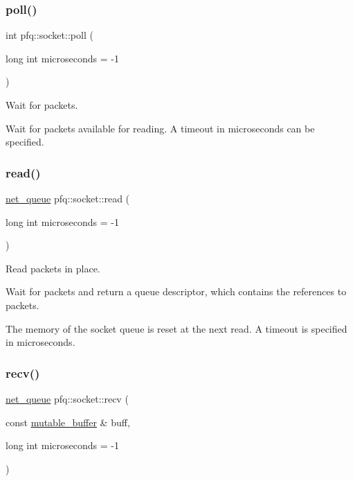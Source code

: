 \subsubsection{\texorpdfstring{poll()}{poll()}}
{\footnotesize\ttfamily int pfq\+::socket\+::poll (\begin{DoxyParamCaption}\item[{long int}]{microseconds = {\ttfamily -\/1} }\end{DoxyParamCaption})\hspace{0.3cm}{\ttfamily [inline]}}



Wait for packets. 

Wait for packets available for reading. A timeout in microseconds can be specified. \mbox{\label{classpfq_1_1socket_a6004249d3abfe8a2329b44ba797d1909}} 
\subsubsection{\texorpdfstring{read()}{read()}}
{\footnotesize\ttfamily \hyperlink{classpfq_1_1net__queue}{net\+\_\+queue} pfq\+::socket\+::read (\begin{DoxyParamCaption}\item[{long int}]{microseconds = {\ttfamily -\/1} }\end{DoxyParamCaption})\hspace{0.3cm}{\ttfamily [inline]}}



Read packets in place. 

Wait for packets and return a \textquotesingle{}queue\textquotesingle{} descriptor, which contains the references to packets.

The memory of the socket queue is reset at the next read. A timeout is specified in microseconds. \mbox{\label{classpfq_1_1socket_a57643b9011269682bf716254c2b72907}} 
\subsubsection{\texorpdfstring{recv()}{recv()}}
{\footnotesize\ttfamily \hyperlink{classpfq_1_1net__queue}{net\+\_\+queue} pfq\+::socket\+::recv (\begin{DoxyParamCaption}\item[{const \hyperlink{namespacepfq_ad7b88920eaf729154354741132483ea8}{mutable\+\_\+buffer} \&}]{buff,  }\item[{long int}]{microseconds = {\ttfamily -\/1} }\end{DoxyParamCaption})\hspace{0.3cm}{\ttfamily [inline]}}



